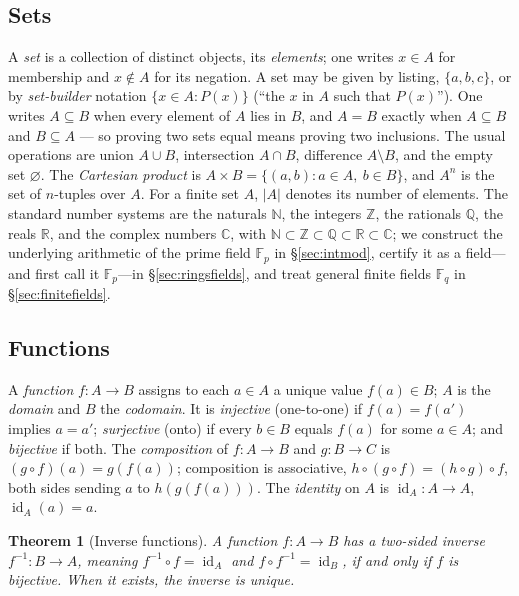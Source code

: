 \documentclass[11pt,a4paper]{article}
\newtheorem{theorem}{Theorem}[section]
\theoremstyle{definition}
\theoremstyle{remark}
\newcommand{\N}{\ensuremath{\mathbb{N}}}
\newcommand{\Z}{\ensuremath{\mathbb{Z}}}
\newcommand{\Q}{\ensuremath{\mathbb{Q}}}
\newcommand{\R}{\ensuremath{\mathbb{R}}}
\providecommand{\C}{}\renewcommand{\C}{\ensuremath{\mathbb{C}}}
\newcommand{\Fp}{\ensuremath{\mathbb{F}_{p}}}
\newcommand{\Fq}{\ensuremath{\mathbb{F}_{q}}}
\DeclareMathOperator{\id}{id}
\begin{document}
\subsection{Sets}\label{sets:subsec:sets}
A \emph{set} is a collection of distinct objects, its \emph{elements}; one
writes \(x \in A\) for membership and \(x \notin A\) for its negation. A set
may be given by listing, \(\{a,b,c\}\), or by \emph{set-builder} notation
\(\{x \in A : P(x)\}\) (``the \(x\) in \(A\) such that \(P(x)\)''). One
writes \(A \subseteq B\) when every element of \(A\) lies in \(B\), and
\(A = B\) exactly when \(A \subseteq B\) and \(B \subseteq A\) --- so proving
two sets equal means proving two inclusions. The usual operations are union
\(A \cup B\), intersection \(A \cap B\), difference \(A \setminus B\), and
the empty set \(\varnothing\). The \emph{Cartesian product} is
\(A \times B = \{(a,b) : a \in A,\ b \in B\}\), and \(A^n\) is the set of
\(n\)-tuples over \(A\). For a finite set \(A\), \(\lvert A\rvert\) denotes
its number of elements. The standard number systems are the naturals \(\N\),
the integers \(\Z\), the rationals \(\Q\), the reals \(\R\), and the complex
numbers \(\C\), with \(\N \subset \Z \subset \Q \subset \R \subset \C\); we
construct the underlying arithmetic of the prime field \(\Fp\) in
\S\ref{sec:intmod}, certify it as a field---and first call it
\(\Fp\)---in \S\ref{sec:ringsfields}, and treat general finite fields
\(\Fq\) in \S\ref{sec:finitefields}.

\subsection{Functions}\label{sets:subsec:functions}
A \emph{function} \(f \colon A \to B\) assigns to each \(a \in A\) a unique
value \(f(a) \in B\); \(A\) is the \emph{domain} and \(B\) the
\emph{codomain}. It is \emph{injective} (one-to-one) if \(f(a) = f(a')\)
implies \(a = a'\); \emph{surjective} (onto) if every \(b \in B\) equals
\(f(a)\) for some \(a \in A\); and \emph{bijective} if both. The
\emph{composition} of \(f \colon A \to B\) and \(g \colon B \to C\) is
\((g \circ f)(a) = g(f(a))\); composition is associative,
\(h \circ (g \circ f) = (h \circ g) \circ f\), both sides sending \(a\) to
\(h(g(f(a)))\). The \emph{identity} on \(A\) is
\(\id_A \colon A \to A\), \(\id_A(a) = a\).

\begin{theorem}[Inverse functions]\label{sets:thm:inverse}
A function \(f \colon A \to B\) has a two-sided \emph{inverse}
\(f^{-1} \colon B \to A\), meaning \(f^{-1} \circ f = \id_A\) and
\(f \circ f^{-1} = \id_B\), if and only if \(f\) is bijective. When it
exists, the inverse is unique.
\end{theorem}
\end{document}
